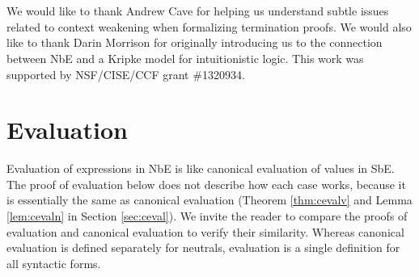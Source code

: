 \documentclass{llncs}
\newcommand{\refthm}[1]{Theorem \ref{thm:#1}}
\newcommand{\reflem}[1]{Lemma \ref{lem:#1}}
\newcommand{\refsec}[1]{Section \ref{sec:#1}}
\begin{document}
\section*{\ackname}

We would like to thank Andrew Cave for helping us understand subtle
issues related to context weakening when formalizing termination proofs. We would also
like to thank Darin Morrison for originally introducing us to the connection
between NbE and a Kripke model for intuitionistic logic.
This work was supported by NSF/CISE/CCF grant \#1320934.






\clearpage

\section*{\appendixname}
\appendix

\section{Evaluation}
\label{sec:eval}

Evaluation of expressions in NbE is like canonical evaluation of
values in SbE. The proof of evaluation below does not describe how
each case works, because it is essentially the same as
canonical evaluation (\refthm{cevalv} and \reflem{cevaln} in
\refsec{ceval}). We invite the reader to compare the proofs of
evaluation and canonical evaluation to verify their similarity.
Whereas canonical evaluation is defined separately for neutrals,
evaluation is a single definition for all syntactic forms.
\end{document}
